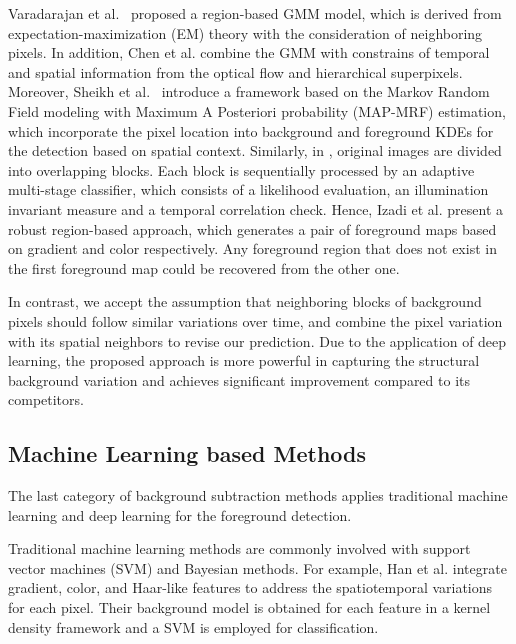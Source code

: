 \documentclass[journal]{IEEEtran}
\begin{document}
Varadarajan et al.\ \cite{2015_PR_Varadarajan20153488} proposed a region-based GMM model,
which is derived from expectation-maximization (EM) theory with the consideration of neighboring pixels.
In addition, 
Chen et al. \cite{2017_TPAMI_GANGWANG} combine the GMM with constrains of temporal and spatial information from the optical flow and hierarchical superpixels.
Moreover, 
Sheikh et al.\ \cite{Sheikh2005Bayesian} introduce a framework based on the Markov Random Field modeling with Maximum A Posteriori 
probability (MAP-MRF) estimation, which incorporate the pixel location into background and foreground KDEs for the detection based on spatial context.
Similarly, in \cite{Reddy2010Robust}, original images are divided into overlapping blocks. Each block is sequentially processed by an adaptive multi-stage classifier, which consists of a likelihood evaluation, an illumination invariant measure and a temporal correlation check.
Hence, Izadi et al.\cite{Izadi2008Robust} present a robust region-based approach, which generates a pair of foreground maps based on gradient and color respectively. Any foreground region that does not exist in the first foreground map could be recovered from the other one.

In contrast, we accept the assumption that neighboring blocks of background pixels should follow similar variations over time, and combine the pixel variation with its spatial neighbors to revise our prediction. 
Due to the application of deep learning, the proposed approach is more powerful in capturing the structural background variation and achieves significant improvement compared to its competitors.
%
%
%
\subsection{Machine Learning based Methods}
The last category of background subtraction methods applies traditional machine learning and deep learning for the foreground detection.

%
Traditional machine learning methods are commonly involved with support vector machines (SVM)\cite{Chen2011}\cite{Han2012} and Bayesian methods\cite{Sheikh2005Bayesian}\cite{2012_TIP_OP_6099616}\cite{Zhang2014Statis}. For example, Han et al. \cite{Han2012} integrate gradient, color, and Haar-like features to address the spatiotemporal variations for each pixel. Their background model is obtained for each feature in a kernel density framework and a SVM is employed for classification.
\end{document}
